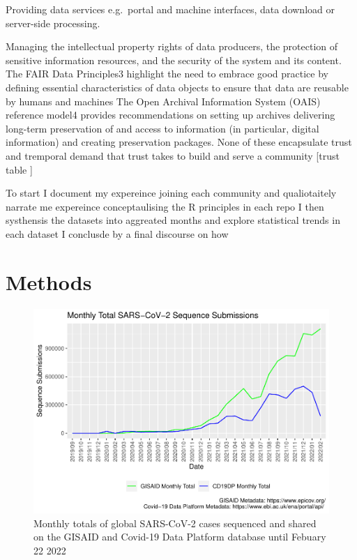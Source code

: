 \documentclass{article}
\begin{document}
Providing data services e.g.~portal and machine interfaces, data
download or server-side processing.

Managing the intellectual property rights of data producers, the
protection of sensitive information resources, and the security of the
system and its content. The FAIR Data Principles3 highlight the need to
embrace good practice by defining essential characteristics of data
objects to ensure that data are reusable by humans and machines The Open
Archival Information System (OAIS) reference model4 provides
recommendations on setting up archives delivering long-term preservation
of and access to information (in particular, digital information) and
creating preservation packages. None of these encapsulate trust and
tremporal demand that trust takes to build and serve a community
{[}trust table {]}

To start I document my expereince joining each community and
qualiotaitely narrate me expereince conceptaulising the R principles in
each repo I then systhensis the datasets into aggreated months and
explore statistical trends in each dataset I conclusde by a final
discourse on how

\hypertarget{methods}{%
\section{Methods}\label{methods}}

\begin{figure}
\centering
\includegraphics{Report_files/figure-latex/fig2-1.pdf}
\caption{Monthly totals of global SARS-CoV-2 cases sequenced and shared
on the GISAID and Covid-19 Data Platform database until Febuary 22 2022}
\end{figure}
\end{document}
